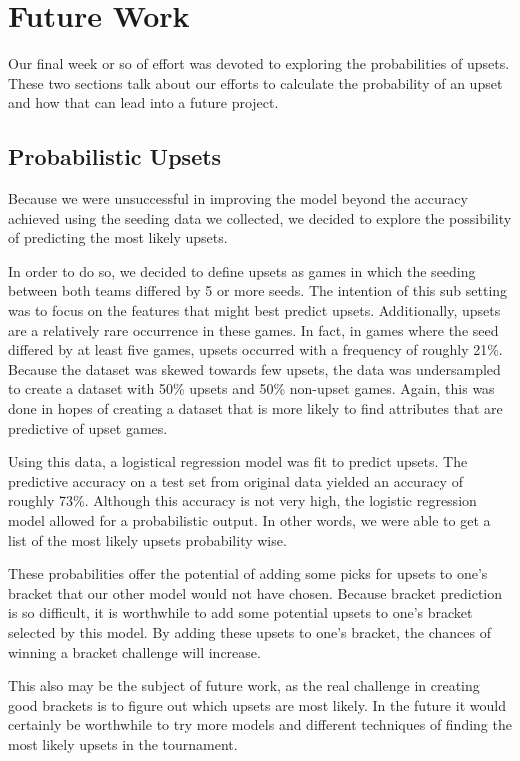 \section{Future Work}

Our final week or so of effort was devoted to exploring the probabilities of upsets. 
These two sections talk about our efforts to calculate the probability of an upset and how that can lead into a future project.

\subsection{Probabilistic Upsets}

Because we were unsuccessful in improving the model beyond the accuracy achieved using the seeding data we collected, we decided to explore the possibility of predicting the most likely upsets. 

In order to do so, we decided to define upsets as games in which the seeding between both teams differed by 5 or more seeds. 
The intention of this sub setting was to focus on the features that might best predict upsets. 
Additionally, upsets are a relatively rare occurrence in these games. 
In fact, in games where the seed differed by at least five games, upsets occurred with a frequency of roughly 21\%.
Because the dataset was skewed towards few upsets, the data was undersampled to create a dataset with 50\% upsets and 50\% non-upset games. 
Again, this was done in hopes of creating a dataset that is more likely to find attributes that are predictive of upset games. 

Using this data, a logistical regression model was fit to predict upsets. 
The predictive accuracy on a test set from original data yielded an accuracy of roughly 73\%. 
Although this accuracy is not very high, the logistic regression model allowed for a probabilistic output. 
In other words, we were able to get a list of the most likely upsets probability wise. 

These probabilities offer the potential of adding some picks for upsets to one’s bracket that our other model would not have chosen. 
Because bracket prediction is so difficult, it is worthwhile to add some potential upsets to one’s bracket selected by this model. 
By adding these upsets to one’s bracket, the chances of winning a bracket challenge will increase. 

This also may be the subject of future work, as the real challenge in creating good brackets is to figure out which upsets are most likely. 
In the future it would certainly be worthwhile to try more models and different techniques of finding the most likely upsets in the tournament.

